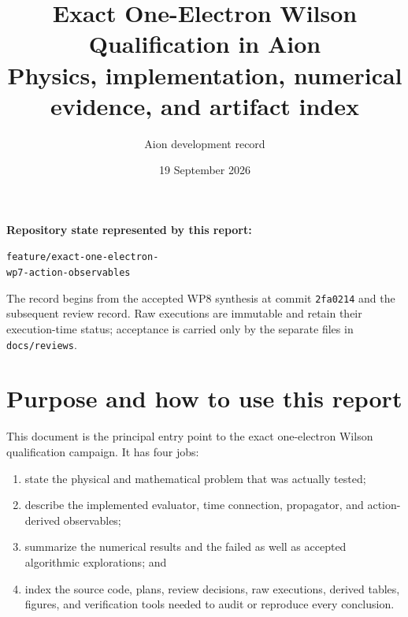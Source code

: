 \documentclass[11pt]{article}
\title{\textbf{Exact One-Electron Wilson Qualification in Aion}\\
\large Physics, implementation, numerical evidence, and artifact index}
\author{Aion development record}
\date{19 September 2026}
\begin{document}
\maketitle

\begin{center}
\end{center}

\vspace{0.5em}
\noindent\textbf{Repository state represented by this report:}
\begin{center}
\texttt{feature/exact-one-electron-}\\
\texttt{wp7-action-observables}
\end{center}
The record begins from the accepted WP8 synthesis at commit \texttt{2fa0214}
and the subsequent review record.  Raw executions are immutable and retain
their execution-time status; acceptance is carried only by the separate files
in \texttt{docs/reviews}.

\tableofcontents
\listoffigures
\listoftables
\clearpage

\section{Purpose and how to use this report}

This document is the principal entry point to the exact one-electron Wilson
qualification campaign.  It has four jobs:

\begin{enumerate}
  \item state the physical and mathematical problem that was actually tested;
  \item describe the implemented evaluator, time connection, propagator, and
        action-derived observables;
  \item summarize the numerical results and the failed as well as accepted
        algorithmic explorations; and
  \item index the source code, plans, review decisions, raw executions,
        derived tables, figures, and verification tools needed to audit or
        reproduce every conclusion.
\end{enumerate}
\end{document}

